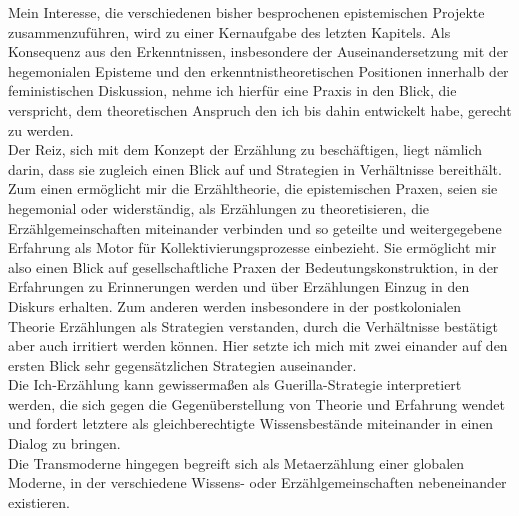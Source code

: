 \noindent Mein Interesse, die verschiedenen bisher besprochenen epistemischen Projekte
zusammenzuführen, wird zu einer Kernaufgabe des letzten Kapitels. Als Konsequenz
aus den Erkenntnissen, insbesondere der Auseinandersetzung mit der hegemonialen
Episteme und den erkenntnistheoretischen Positionen innerhalb der feministischen
Diskussion,  nehme ich hierfür eine Praxis in den Blick, die verspricht, dem
theoretischen Anspruch den ich bis dahin entwickelt habe, gerecht zu werden.\\
 Der
Reiz, sich mit dem Konzept der Erzählung zu beschäftigen, liegt nämlich darin,
dass sie zugleich einen Blick auf und Strategien in Verhältnisse bereithält. \\
Zum
einen ermöglicht mir die Erzähltheorie, die epistemischen Praxen, seien sie
hegemonial oder widerständig, als Erzählungen zu theoretisieren, die
Erzählgemeinschaften miteinander verbinden und so geteilte und weitergegebene
Erfahrung als Motor für Kollektivierungsprozesse einbezieht. Sie ermöglicht mir
also einen Blick auf gesellschaftliche Praxen der Bedeutungskonstruktion, in der
Erfahrungen zu Erinnerungen werden und über Erzählungen Einzug in den Diskurs
erhalten. Zum anderen werden insbesondere in der postkolonialen Theorie
Erzählungen als Strategien verstanden, durch die Verhältnisse bestätigt aber
auch irritiert werden können. Hier setzte ich mich mit zwei einander auf den
ersten Blick sehr gegensätzlichen Strategien auseinander. \\
Die Ich-Erzählung kann
gewissermaßen als Guerilla-Strategie interpretiert werden, die sich gegen die
Gegenüberstellung von Theorie und Erfahrung wendet und fordert letztere als
gleichberechtigte Wissensbestände miteinander in einen Dialog zu bringen. \\
Die
Transmoderne hingegen begreift sich als Metaerzählung einer globalen Moderne, in
der verschiedene Wissens- oder Erzählgemeinschaften nebeneinander existieren.\\

